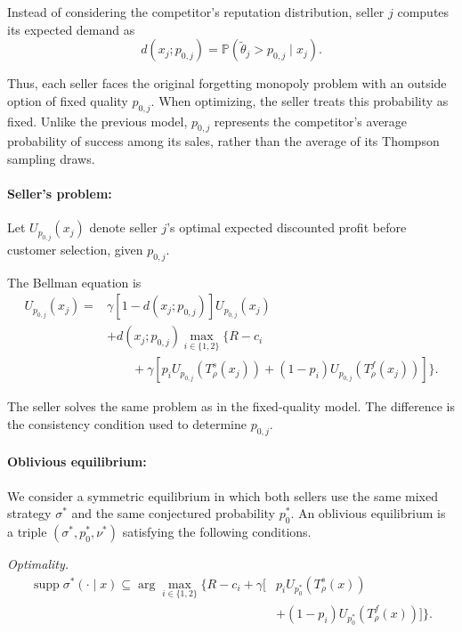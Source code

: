 \documentclass[11pt]{article}
\begin{document}
Instead of considering the competitor's reputation
distribution, seller $j$ computes its expected demand as
\begin{equation}
d(x_j;p_{0,j}) = \mathbb{P}(\widetilde{\theta}_j>p_{0,j}\mid x_j).
\end{equation}

Thus, each seller faces the original forgetting monopoly
problem with an outside option of fixed quality $p_{0,j}$.
When optimizing, the seller treats this probability as fixed. Unlike the
previous model, $p_{0,j}$ represents the competitor's
average probability of success among its sales, rather
than the average of its Thompson sampling draws.

\paragraph{Seller's problem:}
Let $U_{p_{0,j}}(x_j)$ denote seller $j$'s optimal expected
discounted profit before customer selection, given
$p_{0,j}$.

The Bellman equation is
\begin{equation}
\begin{aligned}
U_{p_{0,j}}(x_j) ={}& \gamma[1-d(x_j;p_{0,j})]U_{p_{0,j}}(x_j)\\
& + d(x_j;p_{0,j}) \max_{i\in\{1,2\}} \Big\{ R-c_i\\
&\qquad+ \gamma\left[ p_iU_{p_{0,j}}(T_\rho^s(x_j)) + (1-p_i)U_{p_{0,j}}(T_\rho^f(x_j)) \right] \Big\}.
\end{aligned}
\end{equation}

The seller solves the same problem as in the fixed-quality
model. The difference is the consistency condition used
to determine $p_{0,j}$.

\paragraph{Oblivious equilibrium:}
We consider a symmetric equilibrium in which both sellers
use the same mixed strategy $\sigma^*$ and the same
conjectured probability $p_0^*$. An oblivious equilibrium is a triple
$(\sigma^*,p_0^*,\nu^*)$ satisfying the following conditions.

\textit{Optimality.}
\begin{equation}
\begin{aligned}
\operatorname{supp}\sigma^*(\cdot\mid x)
\subseteq
\arg\max_{i\in\{1,2\}}
\Big\{
R-c_i
+\gamma\big[
&p_iU_{p_0^*}(T_\rho^s(x))\\
&+(1-p_i)U_{p_0^*}(T_\rho^f(x))
\big]
\Big\}.
\end{aligned}
\end{equation}
\end{document}
